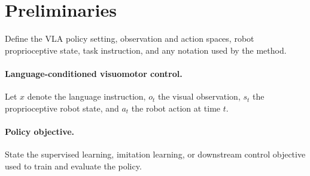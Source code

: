 \section{Preliminaries}

Define the VLA policy setting, observation and action spaces, robot
proprioceptive state, task instruction, and any notation used by the method.

\paragraph{Language-conditioned visuomotor control.}
Let \(x\) denote the language instruction, \(o_t\) the visual observation,
\(s_t\) the proprioceptive robot state, and \(a_t\) the robot action at time
\(t\).

\paragraph{Policy objective.}
State the supervised learning, imitation learning, or downstream control
objective used to train and evaluate the policy.
